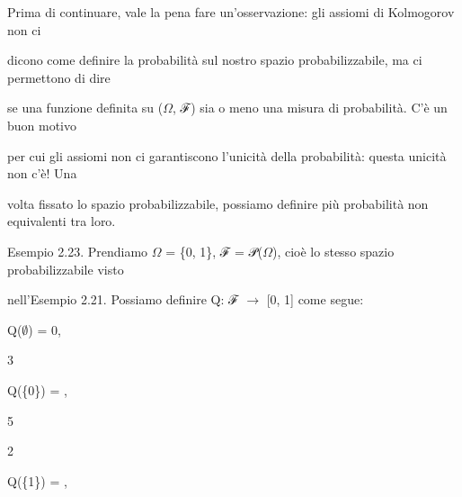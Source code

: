 \documentclass[a4paper,portrait,12pt]{article}
\begin{document}
\begin{flushleft}
Prima di continuare, vale la pena fare un'osservazione: gli assiomi di Kolmogorov non ci
\end{flushleft}


\begin{flushleft}
dicono come definire la probabilit\`{a} sul nostro spazio probabilizzabile, ma ci permettono di dire
\end{flushleft}


\begin{flushleft}
se una funzione definita su ($\Omega$, ℱ) sia o meno una misura di probabilit\`{a}. C'\`{e} un buon motivo
\end{flushleft}


\begin{flushleft}
per cui gli assiomi non ci garantiscono l'unicit\`{a} della probabilit\`{a}: questa unicit\`{a} non c'\`{e}! Una
\end{flushleft}


\begin{flushleft}
volta fissato lo spazio probabilizzabile, possiamo definire più probabilit\`{a} non equivalenti tra loro.
\end{flushleft}





\begin{flushleft}
Esempio 2.23. Prendiamo $\Omega$ = \{0, 1\}, ℱ = 𝒫($\Omega$), cio\`{e} lo stesso spazio probabilizzabile visto
\end{flushleft}


\begin{flushleft}
nell'Esempio 2.21. Possiamo definire Q: ℱ $\rightarrow$ [0, 1] come segue:
\end{flushleft}


\begin{flushleft}
Q($\emptyset$) = 0,
\end{flushleft}





3


\begin{flushleft}
Q(\{0\}) = ,
\end{flushleft}


5





2


\begin{flushleft}
Q(\{1\}) = ,
\end{flushleft}
\end{document}
